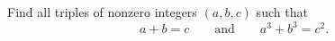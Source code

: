 Find all triples of nonzero integers $(a,b,c)$ such that
\[a+b=c\qquad\text{and}\qquad a^3+b^3=c^2 .\]
